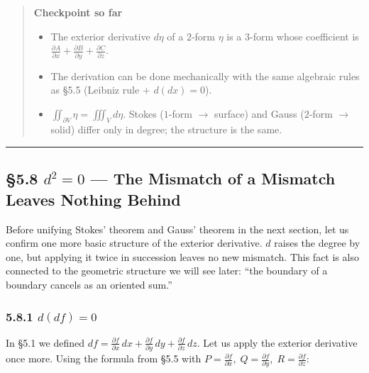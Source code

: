 \begin{quote}
\textbf{Checkpoint so far}

\begin{itemize}
\item
  The exterior derivative \(d\eta\) of a \(2\)-form \(\eta\) is a
  \(3\)-form whose coefficient is
  \(\frac{\partial A}{\partial x} + \frac{\partial B}{\partial y} + \frac{\partial C}{\partial z}\).
\item
  The derivation can be done mechanically with the same algebraic rules
  as §5.5 (Leibniz rule \(+\) \(d(dx)=0\)).
\item
  \(\iint_{\partial V} \eta = \iiint_V d\eta\). Stokes (\(1\)-form
  \(\to\) surface) and Gauss (\(2\)-form \(\to\) solid) differ only in
  degree; the structure is the same.
\end{itemize}
\end{quote}

\begin{center}\rule{0.5\linewidth}{0.5pt}\end{center}

\hypertarget{d2-0-the-mismatch-of-a-mismatch-leaves-nothing-behind}{%
\subsection{\texorpdfstring{§5.8 \(d^2 = 0\) --- The Mismatch of a
Mismatch Leaves Nothing
Behind}{§5.8 d\^{}2 = 0 --- The Mismatch of a Mismatch Leaves Nothing Behind}}\label{d2-0-the-mismatch-of-a-mismatch-leaves-nothing-behind}}

Before unifying Stokes' theorem and Gauss' theorem in the next section,
let us confirm one more basic structure of the exterior derivative.
\(d\) raises the degree by one, but applying it twice in succession
leaves no new mismatch. This fact is also connected to the geometric
structure we will see later: ``the boundary of a boundary cancels as an
oriented sum.''

\hypertarget{ddf-0}{%
\subsubsection{\texorpdfstring{5.8.1
\(d(df) = 0\)}{5.8.1 d(df) = 0}}\label{ddf-0}}

In §5.1 we defined
\(df = \frac{\partial f}{\partial x}\,dx + \frac{\partial f}{\partial y}\,dy + \frac{\partial f}{\partial z}\,dz\).
Let us apply the exterior derivative once more. Using the formula from
§5.5 with
\(P = \frac{\partial f}{\partial x},\; Q = \frac{\partial f}{\partial y},\; R = \frac{\partial f}{\partial z}\):

